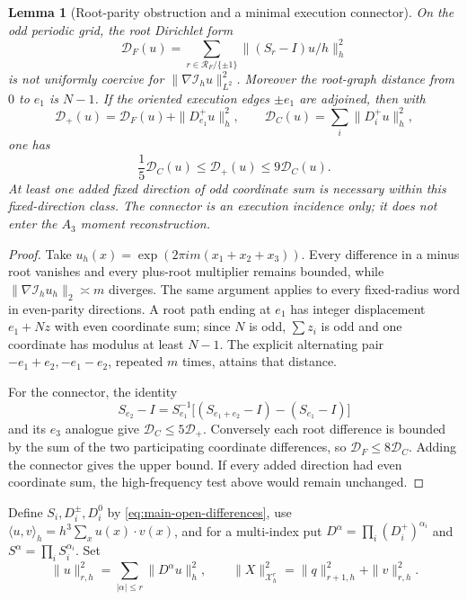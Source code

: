 \documentclass[11pt]{article}
\numberwithin{equation}{section}
\newtheorem{lemma}[lemma]{Lemma}
\theoremstyle{definition}
\theoremstyle{remark}
\begin{document}
\begin{lemma}[Root-parity obstruction and a minimal execution connector]
\label{lem:supp-open-parity}
On the odd periodic grid, the root Dirichlet form
\begin{equation}
 \mathcal D_F(u)=\sum_{r\in\mathcal R_F/\{\pm1\}}
       \|(S_r-I)u/h\|_h^2
 \label{eq:supp-open-root-dirichlet}
\end{equation}
is not uniformly coercive for
$\|\nabla\mathcal I_hu\|_{L^2}^2$.  Moreover the root-graph distance from
$0$ to $e_1$ is $N-1$.  If the oriented execution edges $\pm e_1$ are
adjoined, then with
\begin{equation}
 \mathcal D_+(u)=\mathcal D_F(u)+\|D_{e_1}^+u\|_h^2,
 \qquad \mathcal D_C(u)=\sum_i\|D_i^+u\|_h^2,
 \label{eq:supp-open-connector-energy}
\end{equation}
one has
\begin{equation}
 \frac15\mathcal D_C(u)\le\mathcal D_+(u)\le9\mathcal D_C(u).
 \label{eq:supp-open-connector-coercivity}
\end{equation}
At least one added fixed direction of odd coordinate sum is necessary within
this fixed-direction class.  The connector is an execution incidence only;
it does not enter the $A_3$ moment reconstruction.
\end{lemma}
\begin{proof}
Take
$u_h(x)=\exp(2\pi i m(x_1+x_2+x_3))$.  Every difference in a minus root
vanishes and every plus-root multiplier remains bounded, while
$\|\nabla\mathcal I_hu_h\|_2\asymp m$ diverges.  The same argument applies to
every fixed-radius word in even-parity directions.  A root path ending at
$e_1$ has integer displacement $e_1+Nz$ with even coordinate sum; since $N$
is odd, $\sum z_i$ is odd and one coordinate has modulus at least $N-1$.
The explicit alternating pair $-e_1+e_2,-e_1-e_2$, repeated $m$ times,
attains that distance.

For the connector, the identity
\[
 S_{e_2}-I=S_{e_1}^{-1}\bigl[(S_{e_1+e_2}-I)-(S_{e_1}-I)\bigr]
\]
and its $e_3$ analogue give
$\mathcal D_C\le5\mathcal D_+$.  Conversely each root difference is bounded
by the sum of the two participating coordinate differences, so
$\mathcal D_F\le8\mathcal D_C$.  Adding the connector gives the upper bound.
If every added direction had even coordinate sum, the high-frequency test
above would remain unchanged.
\end{proof}

Define $S_i,D_i^\pm,D_i^0$ by \eqref{eq:main-open-differences}, use
$\langle u,v\rangle_h=h^3\sum_xu(x)\cdot v(x)$, and for a multi-index put
$D^\alpha=\prod_i(D_i^+)^{\alpha_i}$ and
$S^\alpha=\prod_iS_i^{\alpha_i}$.  Set
\begin{equation}
 \|u\|_{r,h}^2=\sum_{|\alpha|\le r}\|D^\alpha u\|_h^2,
 \qquad
 \|X\|_{\mathcal X_h^r}^2=\|q\|_{r+1,h}^2+\|v\|_{r,h}^2.
 \label{eq:supp-open-norms}
\end{equation}
\end{document}
